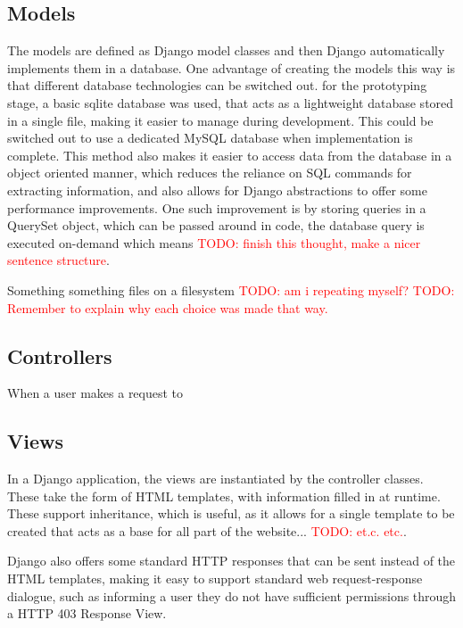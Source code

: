 \documentclass[a4paper,11pt]{report}
\newcommand{\todo}[1]{\textcolor{red}{TODO: #1}}
\begin{document}
\subsection{Models}
The models are defined as Django model classes and then Django automatically implements them in a database. One advantage of creating the models this way is that different database technologies can be switched out. for the prototyping stage, a basic sqlite database was used, that acts as a lightweight database stored in a single file, making it easier to manage during development. This could be switched out to use a dedicated MySQL database when implementation is complete. This method also makes it easier to access data from the database in a object oriented manner, which reduces the reliance on SQL commands for extracting information, and also allows for Django abstractions to offer some performance improvements. One such improvement is by storing queries in a QuerySet object, which can be passed around in code, the database query is executed on-demand which means \todo{finish this thought, make a nicer sentence structure}.\par
Something something files on a filesystem \todo{am i repeating myself?}
\todo{Remember to explain why each choice was made that way.}
\subsection{Controllers}
When a user makes a request to 

\subsection{Views}
In a Django application, the views are instantiated by the controller classes. These take the form of HTML templates, with information filled in at runtime. These support inheritance, which is useful, as it allows for a single template to be created that acts as a base for all part of the website... \todo{et.c. etc.}.\par
Django also offers some standard HTTP responses that can be sent instead of the HTML templates, making it easy to support standard web request-response dialogue, such as informing a user they do not have sufficient permissions through a HTTP 403 Response View.
\end{document}
